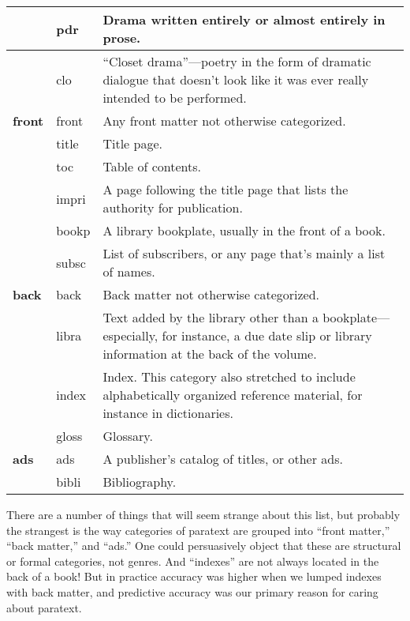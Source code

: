 \documentclass[paper=a4, fontsize=12pt]{scrartcl}
\numberwithin{equation}{section}		%
\numberwithin{figure}{section}			%
\numberwithin{table}{section}				%
\begin{document}
\begin{centering}
\begin{longtable}{ | l | l | p{10cm} |}
& pdr & Drama written entirely or almost entirely in prose.  \\ \hline
& clo & ``Closet drama''---poetry in the form of dramatic dialogue that doesn't look like it was ever really intended to be performed.  \\ \hline
\textbf{front} & front & Any front matter not otherwise categorized.  \\ \hline
& title & Title page.  \\ \hline
& toc & Table of contents.  \\ \hline
& impri & A page following the title page that lists the authority for publication.  \\ \hline
& bookp & A library bookplate, usually in the front of a book.  \\ \hline
& subsc & List of subscribers, or any page that's mainly a list of names.  \\ \hline
\textbf{back} & back & Back matter not otherwise categorized.  \\ \hline
& libra & Text added by the library other than a bookplate---especially, for instance, a due date slip or library information at the back of the volume.  \\ \hline
& index & Index. This category also stretched to include alphabetically organized reference material, for instance in dictionaries. \\ \hline
& gloss & Glossary.  \\ \hline
\textbf{ads} & ads & A publisher's catalog of titles, or other ads.  \\ \hline
& bibli & Bibliography.  \\ \hline
\end{longtable}
\end{centering}

There are a number of things that will seem strange about this list, but probably the strangest is the way categories of paratext are grouped into ``front matter,'' ``back matter,'' and ``ads.'' One could persuasively object that these are structural or formal categories, not genres. And ``indexes'' are not always located in the back of a book! But in practice accuracy was higher when we lumped indexes with back matter, and predictive accuracy was our primary reason for caring about paratext.
\end{document}
